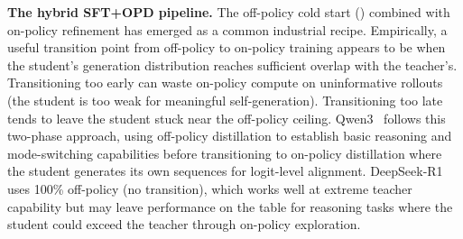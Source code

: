\documentclass{article} %
\begin{document}
\textbf{The hybrid SFT+OPD pipeline.} The off-policy cold start (\citet{2604.13016}) combined with on-policy refinement has emerged as a common industrial recipe. Empirically, a useful transition point from off-policy to on-policy training appears to be when the student's generation distribution reaches sufficient overlap with the teacher's. Transitioning too early can waste on-policy compute on uninformative rollouts (the student is too weak for meaningful self-generation). Transitioning too late tends to leave the student stuck near the off-policy ceiling. Qwen3~\citep{2505.09388} follows this two-phase approach, using off-policy distillation to establish basic reasoning and mode-switching capabilities before transitioning to on-policy distillation where the student generates its own sequences for logit-level alignment. DeepSeek-R1~\citep{2501.12948} uses 100\% off-policy (no transition), which works well at extreme teacher capability but may leave performance on the table for reasoning tasks where the student could exceed the teacher through on-policy exploration.
\end{document}
